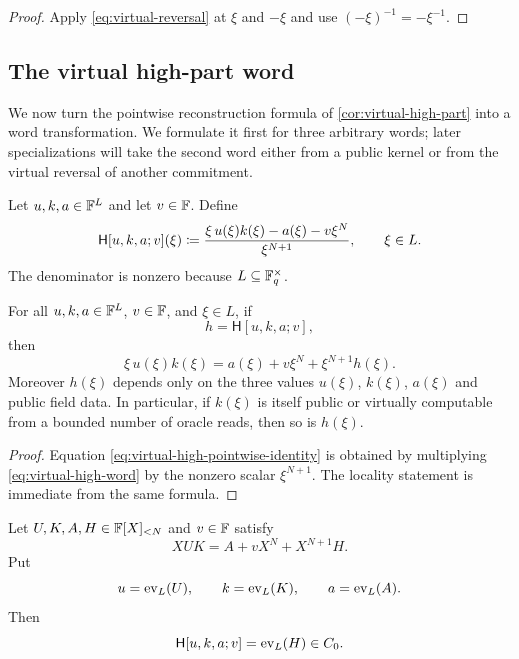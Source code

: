 \begin{proof}
Apply \eqref{eq:virtual-reversal} at $\xi$ and $-\xi$ and use $(-\xi)^{-1}=-\xi^{-1}$.
\end{proof}

\subsection{The virtual high-part word}
\label{sec:virtual-high-word}

We now turn the pointwise reconstruction formula of \cref{cor:virtual-high-part} into a word transformation.  We formulate it first for three arbitrary words; later specializations will take the second word either from a public kernel or from the virtual reversal of another commitment.

\begin{definition}
\label{def:virtual-high-word}
Let $u,k,a\in\mathbb{F}^L$ and let $v\in\mathbb{F}$.  Define
\begin{equation}
  \mathsf H[u,k,a;v](\xi)
  \coloneqq
  \frac{\xi\,u(\xi)k(\xi)-a(\xi)-v\xi^N}{\xi^{N+1}},
  \qquad \xi\in L.
  \label{eq:virtual-high-word}
\end{equation}
The denominator is nonzero because $L\subseteq\mathbb{F}_q^{\times}$.
\end{definition}

\begin{lemma}
\label{lem:virtual-high-locality}
For all $u,k,a\in\mathbb{F}^L$, $v\in\mathbb{F}$, and $\xi\in L$, if
\[
  h=\mathsf H[u,k,a;v],
\]
then
\begin{equation}
  \xi\,u(\xi)k(\xi)
  =a(\xi)+v\xi^N+\xi^{N+1}h(\xi).
  \label{eq:virtual-high-pointwise-identity}
\end{equation}
Moreover $h(\xi)$ depends only on the three values $u(\xi)$, $k(\xi)$, $a(\xi)$ and public field data.  In particular, if $k(\xi)$ is itself public or virtually computable from a bounded number of oracle reads, then so is $h(\xi)$.
\end{lemma}

\begin{proof}
Equation \eqref{eq:virtual-high-pointwise-identity} is obtained by multiplying \eqref{eq:virtual-high-word} by the nonzero scalar $\xi^{N+1}$.  The locality statement is immediate from the same formula.
\end{proof}

\begin{lemma}
\label{lem:virtual-high-honest}
Let $U,K,A,H\in\mathbb{F}[X]_{<N}$ and $v\in\mathbb{F}$ satisfy
\begin{equation}
  XUK=A+vX^N+X^{N+1}H.
  \label{eq:virtual-section-split}
\end{equation}
Put
\[
  u=\operatorname{ev}_L(U),\qquad
  k=\operatorname{ev}_L(K),\qquad
  a=\operatorname{ev}_L(A).
\]
Then
\begin{equation}
  \mathsf H[u,k,a;v]=\operatorname{ev}_L(H)\in C_0.
  \label{eq:virtual-high-honest}
\end{equation}
\end{lemma}

